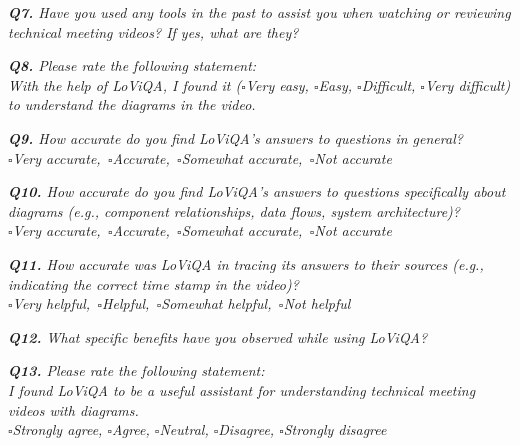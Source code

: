 \vspace*{1em}\noindent\textit{\textbf{Q7.} Have you used any tools in the past to assist you when watching or reviewing technical meeting videos? If yes, what are they?
}







\vspace*{1em}\noindent\textit{\textbf{Q8.} Please rate the following statement:
\\[.5em]
 \textit{With the help of LoViQA, I found it}
($\square$Very easy, $\square$Easy, $\square$Difficult, $\square$Very difficult)
to understand the diagrams in the video.
}


\vspace*{1em}\noindent\textit{\textbf{Q9.} How accurate do you find LoViQA's answers to questions in general?
\\[.5em]
        \indent $\square$Very accurate,\,
        $\square$Accurate,\,
        $\square$Somewhat accurate,\,
        $\square$Not accurate
}



\vspace*{1em}
\noindent\textit{\textbf{Q10.} How accurate do you find LoViQA's answers to questions specifically about diagrams (e.g., component relationships, data flows, system architecture)?
\\[.5em]
        \indent $\square$Very accurate,\,
        $\square$Accurate,\,
        $\square$Somewhat accurate,\,
        $\square$Not accurate
}



\vspace*{1em}
\noindent\textit{\textbf{Q11.} 
How accurate was LoViQA in tracing its answers to their sources
(e.g.,  indicating the correct time stamp in the video)?
\\[.5em]
\indent $\square$Very helpful,\,
$\square$Helpful,\,
$\square$Somewhat helpful,\,
$\square$Not helpful
}


\vspace*{1em}\noindent\textit{\textbf{Q12.} What specific benefits have you observed while using LoViQA?
}


\vspace*{1em}\noindent\textit{\textbf{Q13.} Please rate the following statement:
\\[.5em]
\textit{I found LoViQA to be a useful assistant for understanding technical meeting videos with diagrams.}
\\[.5em]
\indent $\square$Strongly agree,
$\square$Agree,
$\square$Neutral,
$\square$Disagree,
$\square$Strongly disagree
}


